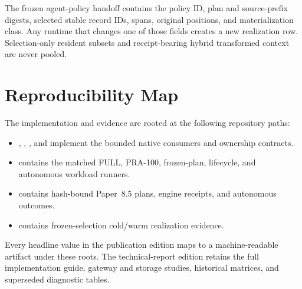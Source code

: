 \documentclass[11pt]{article}
\begin{document}
The frozen agent-policy handoff contains the policy ID, plan and source-prefix
digests, selected stable record IDs, spans, original positions, and
materialization class.  Any runtime that changes one of those fields creates a
new realization row.  Selection-only resident subsets and receipt-bearing
hybrid transformed context are never pooled.

\section{Reproducibility Map}

\enlargethispage{2\baselineskip}
The implementation and evidence are rooted at the following repository paths:

\begin{itemize}[leftmargin=*,nosep]
\item {}, ,
, and  implement the bounded native
consumers and ownership contracts.
\item {} contains the matched FULL, PRA-100,
frozen-plan, lifecycle, and autonomous workload runners.
\item {}
contains hash-bound Paper~8.5 plans, engine receipts, and autonomous outcomes.
\item {}
contains frozen-selection cold/warm realization evidence.
\end{itemize}

Every headline value in the publication edition maps to a machine-readable
artifact under these roots.  The technical-report edition retains the full
implementation guide, gateway and storage studies, historical matrices, and
superseded diagnostic tables.
\normalsize

\fi

\ifdefined\TECHREPORT


\fi
\end{document}
